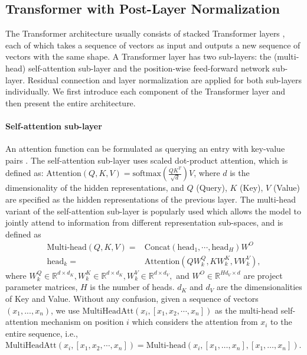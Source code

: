 \documentclass{article}
\begin{document}
\subsection{Transformer  with Post-Layer Normalization}
The Transformer architecture usually consists of stacked Transformer layers \citep{vaswani2017attention,devlin2018bert}, each of which takes a sequence of vectors as input and outputs a new sequence of vectors with the same shape. A Transformer layer has two sub-layers: the (multi-head) self-attention sub-layer and the position-wise feed-forward network sub-layer. Residual connection \citep{he2016deep} and layer normalization \citep{lei2016layer} are applied for both sub-layers individually. We first introduce each component of the Transformer layer and then present the entire architecture.


\paragraph{Self-attention sub-layer}
An attention function can be formulated as querying an entry with key-value pairs \citep{vaswani2017attention}. The self-attention sub-layer uses scaled dot-product attention, which is defined as: $\text{Attention}(Q,K,V)=\text{softmax}(\frac{QK^T}{\sqrt{d}})V$, where $d$ is the dimensionality of the hidden representations, and $Q$ (Query), $K$ (Key), $V$ (Value) are specified as the hidden representations of the previous layer. The multi-head variant of the self-attention sub-layer is popularly used which allows the model to jointly attend to information from different representation sub-spaces, and is defined as
\begin{align}
\text{Multi-head}(Q,K,V) ={}& \text{Concat} (\text{head}_1,\cdots,\text{head}_H)W^O \nonumber\\
\text{head}_k ={}& \text{Attention}(QW_k^Q, KW_k^K,VW_k^V), \nonumber
\end{align}
where $W_k^Q\in \mathbb{R}^{d \times d_K}, W_k^K\in \mathbb{R}^{d \times d_K}, W_k^V\in \mathbb{R}^{d\times d_V},$ and $W^O\in \mathbb{R}^{Hd_V \times d}$ are project parameter matrices, $H$ is the number of heads. $d_K$ and $d_V$ are the dimensionalities of Key and Value. Without any confusion, given a sequence of vectors $(x_1,...,x_n)$, we use $\text{MultiHeadAtt}(x_{i},[ x_{ 1}, x_{2},\cdots, x_{n}])$ as the multi-head self-attention mechanism on position $i$ which considers the attention from $x_i$ to the entire sequence, i.e., $\text{MultiHeadAtt}(x_{i},[ x_{ 1}, x_{2},\cdots, x_{n}])=\text{Multi-head}(x_i, [x_1, \dots, x_n], [x_1, \dots, x_n])$.
\end{document}

